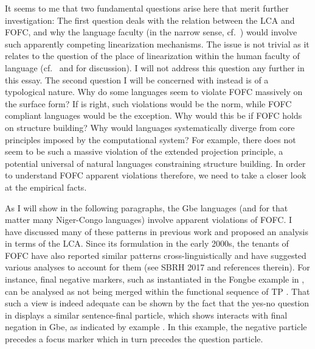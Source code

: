 \documentclass[output=paper]{langsci/langscibook}
\begin{document}
It seems to me that two fundamental questions arise here that merit further
investigation: The first question deals with the relation between the \gls{LCA} and
FOFC, and why the language faculty (in the narrow sense,
cf.~\citealt{hauserchomskyfitch}) would involve such apparently competing
linearization mechanisms. The issue is not trivial as it relates to the
question of the place of linearization within the human faculty of language
(cf.~\citealt{ChoGalOtt2019} and \citealt{Kayne2018} for discussion). I will not
address this question any further in this essay. The second question I will be
concerned with instead is of a typological nature.  Why do some languages seem
to violate \gls{FOFC} massively on the surface form? If \citet{Dryer1992} is right,
such violations would be the norm, while \gls{FOFC} compliant languages would be the
exception. Why would this be if \gls{FOFC} holds on structure building? Why would
languages systematically diverge from core principles imposed by the
computational system? For example, there does not seem to be such a massive
violation of the extended projection principle, a potential universal of
natural languages constraining structure building. In order to understand FOFC
apparent violations therefore, we need to take a closer look at the empirical
facts.

As I will show in the following paragraphs, the Gbe languages (and for that
matter many Niger-Congo languages) involve apparent violations of FOFC. I have
discussed many of these patterns in previous work and proposed an analysis in
terms of the \gls{LCA}. Since its formulation in the early 2000s, the tenants
of \gls{FOFC} have also reported similar patterns cross-linguistically and have
suggested various analyses to account for them (see SBRH 2017 and references
therein).  For instance, final negative markers, such as instantiated in the
Fongbe example in , can be analysed as not being merged
within the functional sequence of TP \parencite[cf.][]{BibHolRob2014}.  That
such a view is indeed adequate can be shown by the fact that the  yes-no
question in  displays a similar sentence-final particle,
which \textcite{Aboh2010a,Aboh2010b} shows interacts with final negation in
Gbe, as indicated by example . In this example, the negative
particle precedes a focus marker which in turn precedes the question particle.
\end{document}
